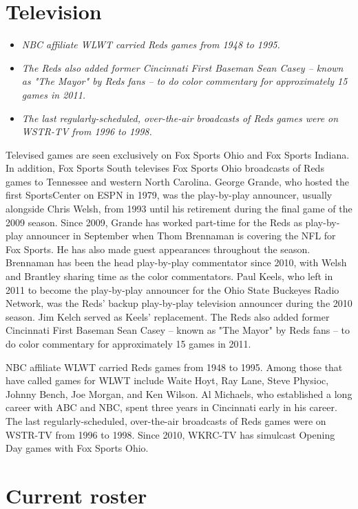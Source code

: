 \section{Television}\label{television}

\begin{itemize}
\item
  \emph{NBC affiliate WLWT carried Reds games from 1948 to 1995.}
\item
  \emph{The Reds also added former Cincinnati First Baseman Sean Casey
  -- known as "The Mayor" by Reds fans -- to do color commentary for
  approximately 15 games in 2011.}
\item
  \emph{The last regularly-scheduled, over-the-air broadcasts of Reds
  games were on WSTR-TV from 1996 to 1998.}
\end{itemize}

Televised games are seen exclusively on Fox Sports Ohio and Fox Sports
Indiana. In addition, Fox Sports South televises Fox Sports Ohio
broadcasts of Reds games to Tennessee and western North Carolina. George
Grande, who hosted the first SportsCenter on ESPN in 1979, was the
play-by-play announcer, usually alongside Chris Welsh, from 1993 until
his retirement during the final game of the 2009 season. Since 2009,
Grande has worked part-time for the Reds as play-by-play announcer in
September when Thom Brennaman is covering the NFL for Fox Sports. He has
also made guest appearances throughout the season. Brennaman has been
the head play-by-play commentator since 2010, with Welsh and Brantley
sharing time as the color commentators. Paul Keels, who left in 2011 to
become the play-by-play announcer for the Ohio State Buckeyes Radio
Network, was the Reds' backup play-by-play television announcer during
the 2010 season. Jim Kelch served as Keels' replacement. The Reds also
added former Cincinnati First Baseman Sean Casey -- known as "The Mayor"
by Reds fans -- to do color commentary for approximately 15 games in
2011.

NBC affiliate WLWT carried Reds games from 1948 to 1995. Among those
that have called games for WLWT include Waite Hoyt, Ray Lane, Steve
Physioc, Johnny Bench, Joe Morgan, and Ken Wilson. Al Michaels, who
established a long career with ABC and NBC, spent three years in
Cincinnati early in his career. The last regularly-scheduled,
over-the-air broadcasts of Reds games were on WSTR-TV from 1996 to 1998.
Since 2010, WKRC-TV has simulcast Opening Day games with Fox Sports
Ohio.

\section{Current roster}\label{current-roster}

